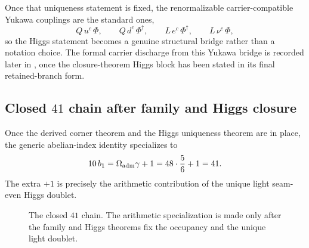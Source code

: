 Once that uniqueness statement is fixed, the renormalizable carrier-compatible Yukawa couplings
are the standard ones,
\[
Q\,u^c\,\Phi,
\qquad
Q\,d^c\,\Phi^\dagger,
\qquad
L\,e^c\,\Phi^\dagger,
\qquad
L\,\nu^c\,\Phi,
\]
so the Higgs statement becomes a genuine structural bridge rather than a notation choice. The
formal carrier discharge from this Yukawa bridge is recorded later in
, once the closure-theorem Higgs block has
been stated in its final retained-branch form.

\subsection{Closed \texorpdfstring{$41$}{41} chain after family and Higgs closure}

Once the derived corner theorem and the Higgs uniqueness theorem are in place, the generic
abelian-index identity  specializes to
\begin{equation}
\label{eq:41-chain-specialized}
10\,b_1
=
\Omega_{\mathrm{adm}}\gamma+1
=
48\cdot\frac56+1
=
41.
\end{equation}
The extra $+1$ is precisely the arithmetic contribution of the unique light seam-even Higgs
doublet.

\begin{figure}[t]
\centering
\footnotesize
{}
\caption{The closed $41$ chain. The arithmetic specialization is made only after the family and
Higgs theorems fix the occupancy and the unique light doublet.}
\label{fig:41-chain-strip}
\end{figure}

